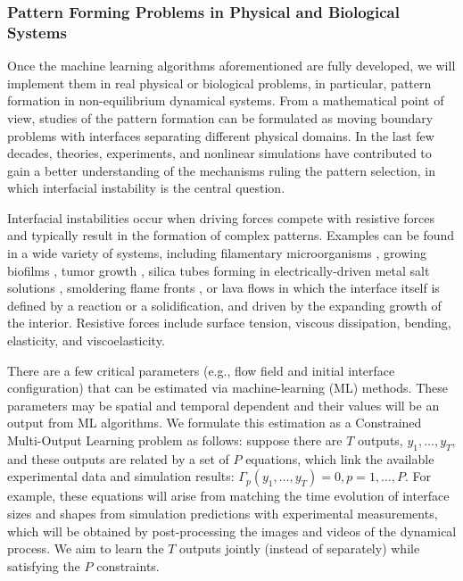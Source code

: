 \subsubsection{Pattern Forming Problems in Physical and Biological Systems}
Once the machine learning algorithms aforementioned are fully developed, we will implement them in real physical or biological problems, in particular, pattern formation in non-equilibrium dynamical systems.  From
a mathematical point of view, studies of the pattern formation can be
formulated as moving boundary problems with interfaces separating
different physical  domains.  In the last few decades, theories,
experiments, and nonlinear simulations have contributed to gain a
better understanding of the mechanisms ruling the pattern selection,
in which interfacial instability is the central question. 

Interfacial instabilities occur when driving forces compete with resistive forces and typically result in the formation of complex patterns. Examples can be found in a wide
variety of systems, including filamentary microorganisms \cite{alain},
growing biofilms \cite{dockery01,Mattei2018}, tumor growth  \cite{MJ2020,Kara2018}, silica tubes forming in electrically-driven metal salt solutions \cite{steinbock03,steinbock16}, smoldering flame fronts
\cite{zik98,Kagan2008}, or lava flows \cite{balmforth00, griffiths00,Roman2021} in which
the interface itself is defined by a reaction or a solidification, and
driven by the expanding growth of the interior. Resistive forces include surface tension, viscous dissipation, bending, elasticity, and viscoelasticity.

There are a few critical parameters (e.g., flow field and initial interface configuration) that can  be estimated via machine-learning (ML) methods. These parameters may be spatial and temporal dependent and their values will be an output from ML algorithms. We formulate this estimation as a Constrained Multi-Output Learning problem as follows: suppose there are $T$ outputs, $y_1, \ldots, y_T$, and these outputs are related by a set of  $P$ equations, which link the available experimental data and simulation results: $\Gamma_p(y_1, \ldots, y_T)=0, p=1, \ldots, P$. For example, these equations will arise from matching the time evolution of interface sizes and shapes from simulation predictions with experimental measurements, which will be obtained by post-processing the images and videos of the  dynamical process. We aim to learn the $T$ outputs jointly (instead of separately) while satisfying the $P$ constraints. 

